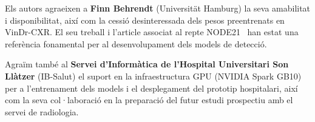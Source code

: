 \documentclass[conference]{IEEEtran}
\begin{document}
Els autors agraeixen a \textbf{Finn Behrendt} (Universität Hamburg) la seva amabilitat i disponibilitat, així com la cessió desinteressada dels pesos preentrenats en VinDr-CXR. El seu treball i l'article associat al repte NODE21~\cite{behrendt2023node21} han estat una referència fonamental per al desenvolupament dels models de detecció.

Agraïm també al \textbf{Servei d'Informàtica de l'Hospital Universitari Son Llàtzer} (IB-Salut) el suport en la infraestructura GPU (NVIDIA Spark GB10) per a l'entrenament dels models i el desplegament del prototip hospitalari, així com la seva col·laboració en la preparació del futur estudi prospectiu amb el servei de radiologia.

%










\end{document}
